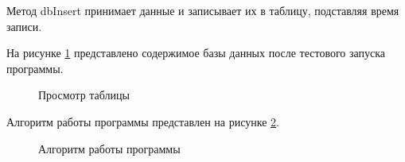 Метод dbInsert принимает данные и записывает их в таблицу, подставляя время записи.

На рисунке \ref{dBase:dBase} представлено содержимое базы данных после тестового запуска программы.

\begin{figure}[h!]
 \caption{Просмотр таблицы}
 \label{dBase:dBase}
\end{figure}

Алгоритм работы программы представлен на рисунке \ref{alg2:alg2}.

\begin{figure}[h!]
 \caption{Алгоритм работы программы}
 \label{alg2:alg2}
\end{figure}